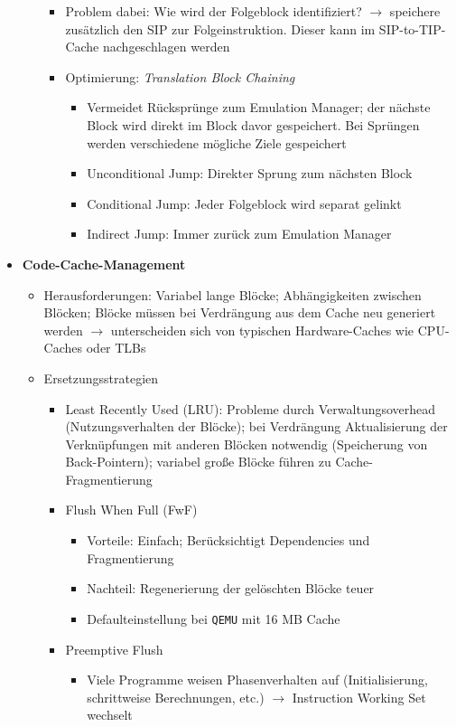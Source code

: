 \begin{itemize}
\begin{itemize}
\begin{itemize}
			\item Problem dabei: Wie wird der Folgeblock identifiziert? \(\rightarrow\) speichere zusätzlich den SIP zur Folgeinstruktion. Dieser kann im SIP-to-TIP-Cache nachgeschlagen werden
			\item Optimierung: \textit{Translation Block Chaining}
			\begin{itemize}
				\item Vermeidet Rücksprünge zum Emulation Manager; der nächste Block wird direkt im Block davor gespeichert. Bei Sprüngen werden verschiedene mögliche Ziele gespeichert
				\item Unconditional Jump: Direkter Sprung zum nächsten Block
				\item Conditional Jump: Jeder Folgeblock wird separat gelinkt
				\item Indirect Jump: Immer zurück zum Emulation Manager
			\end{itemize}
		\end{itemize}
	\end{itemize}
	\item \textbf{Code-Cache-Management}
	\begin{itemize}
		\item Herausforderungen: Variabel lange Blöcke; Abhängigkeiten zwischen Blöcken; Blöcke müssen bei Verdrängung aus dem Cache neu generiert werden \(\rightarrow\) unterscheiden sich von typischen Hardware-Caches wie CPU-Caches oder TLBs
		\item Ersetzungsstrategien
		\begin{itemize}
			\item Least Recently Used (LRU): Probleme durch Verwaltungsoverhead (Nutzungsverhalten der Blöcke); bei Verdrängung Aktualisierung der Verknüpfungen mit anderen Blöcken notwendig (Speicherung von Back-Pointern); variabel große Blöcke führen zu Cache-Fragmentierung
			\item Flush When Full (FwF)
			\begin{itemize}
				\item Vorteile: Einfach; Berücksichtigt Dependencies und Fragmentierung
				\item Nachteil: Regenerierung der gelöschten Blöcke teuer
				\item Defaulteinstellung bei \texttt{QEMU} mit 16 MB Cache
			\end{itemize}
			\item Preemptive Flush
			\begin{itemize}
				\item Viele Programme weisen Phasenverhalten auf (Initialisierung, schrittweise Berechnungen, etc.) \(\rightarrow\) Instruction Working Set wechselt

\end{itemize}
\end{itemize}
\end{itemize}
\end{itemize}
